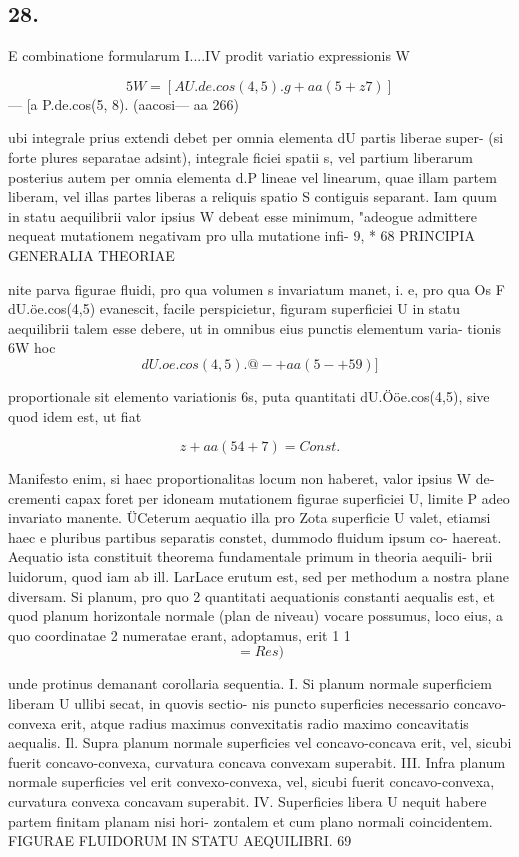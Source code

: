 \documentclass[12pt,a4paper]{article}
\begin{document}
\subsection*{28.}

E combinatione formularum      I....IV      prodit variatio expressionis         W

\[                     5W = [AU.de.cos (4,5). g+aa(5+z7)]\]
--- [a P.de.cos(5, 8). (aacosi---
aa 266)

ubi integrale prius extendi debet per omnia elementa         dU     partis liberae super-
(si forte plures separatae adsint), integrale
ficiei spatii s, vel partium liberarum
posterius autem per omnia elementa d.P lineae vel linearum, quae illam partem
liberam, vel illas partes liberas a reliquis spatio S contiguis separant.
Iam quum in statu aequilibrii valor ipsius W debeat esse minimum,
"adeogue   admittere   nequeat   mutationem     negativam     pro    ulla    mutatione       infi-
9, *
68                          PRINCIPIA GENERALIA THEORIAE

nite parva figurae fluidi, pro qua volumen       s invariatum manet, i. e, pro qua
Os F dU.öe.cos(4,5) evanescit, facile perspicietur, figuram superficiei U in
statu aequilibrii talem esse debere, ut in omnibus eius punctis elementum varia-
tionis 6W     hoc
\[                          dU.oe.cos(4,5). @-+aa(5-+ 59)]\]

proportionale sit elemento variationis 6s, puta quantitati dU.Ööe.cos(4,5),     sive
quod idem est, ut fiat

\[                             z+aa(54+7) = Const.\]

Manifesto enim, si haec proportionalitas locum non haberet, valor ipsius W de-
crementi capax foret per idoneam mutationem figurae superficiei U, limite P
adeo invariato manente.    ÜCeterum aequatio illa pro Zota superficie U valet,
etiamsi haec e pluribus partibus separatis constet,     dummodo   fluidum ipsum co-
haereat.
Aequatio ista constituit theorema fundamentale primum in theoria aequili-
brii luidorum, quod iam ab ill. LarLace erutum est, sed per methodum a nostra
plane diversam.
Si planum, pro quo 2 quantitati aequationis constanti aequalis est, et quod
planum horizontale normale (plan de niveau) vocare possumus,       loco eius, a quo
coordinatae   2 numeratae erant,   adoptamus,    erit
1      1
\[                                   =   Res)\]


unde protinus demanant corollaria sequentia.
I. Si planum normale superficiem liberam U ullibi secat, in quovis sectio-
nis puncto superficies necessario concavo-convexa erit, atque radius maximus
convexitatis radio maximo concavitatis aequalis.
Il. Supra planum normale superficies vel concavo-concava erit, vel, sicubi
fuerit concavo-convexa,    curvatura concava convexam superabit.
III.   Infra planum normale superficies vel erit convexo-convexa, vel, sicubi
fuerit concavo-convexa, curvatura convexa concavam superabit.
IV. Superficies libera U nequit habere partem finitam planam nisi hori-
zontalem et cum plano normali coincidentem.
FIGURAE FLUIDORUM IN STATU AEQUILIBRI.                            69
\end{document}
